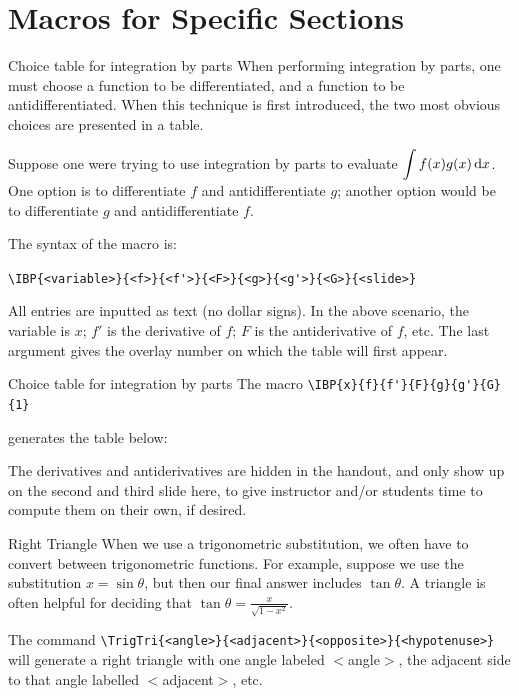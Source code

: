 \documentclass[10pt]{beamer}
\begin{document}
\section{Macros for Specific Sections}
\frame{\tableofcontents[currentsection]}
\begin{frame}[fragile]{Choice table for integration by parts}
When performing integration by parts, one must choose a function to be differentiated, and a function to be antidifferentiated. When this technique is first introduced, the two most obvious choices are presented in a table.
\vfill

Suppose one were trying to use integration by parts to evaluate $\displaystyle\int f(x)g(x)\,\text{d} x$. One option is to differentiate $f$ and antidifferentiate $g$; another option would be to differentiate $g$ and antidifferentiate $f$.
\vfill

The syntax of the macro is:
\vfill

\small
\verb|\IBP{<variable>}{<f>}{<f'>}{<F>}{<g>}{<g'>}{<G>}{<slide>}|
\normalsize
\vfill

All entries are inputted as text (no dollar signs). In the above scenario, the variable is $x$; $f'$ is the derivative of $f$; $F$ is the antiderivative of $f$, etc. The last argument gives the overlay number on which the table will first appear.

\end{frame}
\begin{frame}[fragile]{Choice table for integration by parts}
The macro
\verb|\IBP{x}{f}{f'}{F}{g}{g'}{G}{1}|
 
generates the table below: \vfill

\vfill

The derivatives and antiderivatives are hidden in the handout, and only show up on the second and third slide here, to give instructor and/or students time to compute them on their own, if desired.
\end{frame}
\begin{frame}[fragile]{Right Triangle}
When we use a trigonometric substitution, we often have to convert between trigonometric functions. For example, suppose we use the substitution $x=\sin \theta$, but then our final answer includes $\tan\theta$. A triangle is often helpful for deciding that $\tan\theta = \frac{x}{\sqrt{1-x^2}}$.\vfill

The command \verb|\TrigTri{<angle>}{<adjacent>}{<opposite>}{<hypotenuse>}| will generate a right triangle with one angle labeled $<$angle$>$, the adjacent side to that angle labelled $<$adjacent$>$, etc.

\end{frame}
\end{document}
